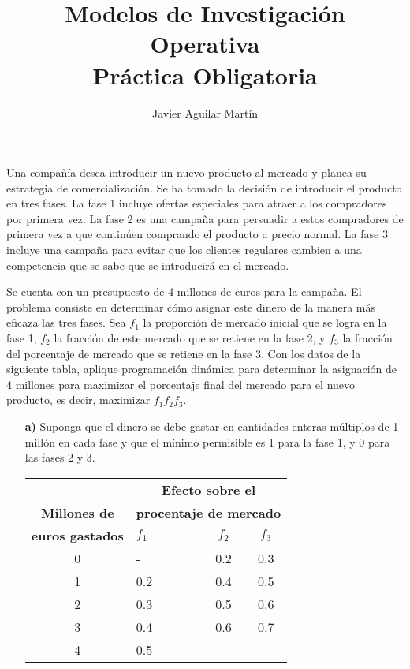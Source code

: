 \documentclass[twoside]{article}
\begin{document}
\title{Modelos de Investigación Operativa\\ Práctica Obligatoria}
\author{Javier Aguilar Martín}
\maketitle



\begin{ejercicio}{1}
Una compañía desea introducir un nuevo producto al mercado y planea su estrategia de comercialización. Se ha tomado la decisión de introducir el producto en tres fases. La fase 1 incluye ofertas especiales para atraer a los compradores por primera vez. La fase 2 es una campaña para persuadir a estos compradores de primera vez a que continúen comprando el producto a precio normal. La fase 3 incluye una campaña para evitar que los clientes regulares cambien a una competencia que se sabe que se introducirá en el mercado.

Se cuenta con un presupuesto de 4 millones de euros para la campaña. El problema consiste en determinar cómo asignar este dinero de la manera más eficaza las tres fases. Sea $f_1$ la proporción de mercado inicial que se logra en la fase 1, $f_2$ la fracción de este mercado que se retiene en la fase 2, y $f_3$ la fracción del porcentaje de mercado que se retiene en la fase 3. Con los datos de la siguiente tabla, aplique programación dinámica para determinar la asignación de 4 millones para maximizar el porcentaje final del mercado para el nuevo producto, es decir, maximizar $f_1f_2f_3$. 
\begin{itemize}
\item[\textbf{a)}] Suponga que el dinero se debe gastar en cantidades enteras múltiplos de 1 millón en cada fase y que el mínimo permisible es 1 para la fase 1, y 0 para las fases 2 y 3.
\begin{center}
\begin{tabular}{c|lcc}
 & \multicolumn{3}{c}{\textbf{Efecto sobre el}}\\
\textbf{Millones de } & \multicolumn{3}{c}{\textbf{procentaje de mercado}} \\\cline{2-4}
\textbf{euros gastados} & $f_1\qquad$ & $f_2$ & $f_3$\\
\hline
0 & - & 0.2 & 0.3\\
1 & 0.2 & 0.4 & 0.5\\
2 & 0.3 & 0.5 & 0.6\\
3 & 0.4 & 0.6 & 0.7\\
4 & 0.5 & - & -
\end{tabular}
\end{center}


\end{itemize}
\end{ejercicio}
\end{document}

